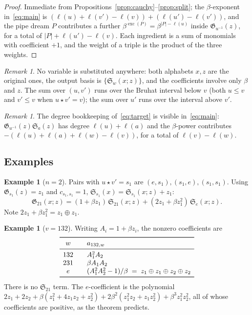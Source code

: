 \documentclass[11pt]{article}
\theoremstyle{definition}
\newtheorem{example}[theorem]{Example}
\theoremstyle{remark}
\newtheorem{remark}[theorem]{Remark}
\newcommand{\Sch}{\mathfrak{S}}
\newcommand{\Groth}{\mathfrak{G}}
\newcommand{\exc}{\operatorname{exc}}
\newcommand{\dem}{\star}
\begin{document}
\begin{proof}
Immediate from Propositions~\ref{prop:cauchy}--\ref{prop:split}; the
$\beta$-exponent in~\eqref{eq:main} is
$(\ell(u)+\ell(v')-\ell(v))+(\ell(u')-\ell(v'))$, and the pipe dream $P$
contributes a further $\beta^{\exc(P)}=\beta^{|P|-\ell(u)}$ inside
$\Groth_{u^{-1}}(z)$, for a total of $|P|+\ell(u')-\ell(v)$.
Each ingredient is a sum of monomials with coefficient $+1$, and the
weight of a triple is the product of the three weights.
\end{proof}

\begin{remark}
No variable is substituted anywhere: both alphabets $x,z$ are the original
ones, the output basis is $\{\Sch_w(x;z)\}$, and the coefficients involve
only $\beta$ and $z$.  The sum over $(u,v')$ runs over the Bruhat interval
below $v$ (both $u\le v$ and $v'\le v$ when $u\dem v'=v$); the sum over
$u'$ runs over the interval above $v'$.
\end{remark}

\begin{remark}
The degree bookkeeping of~\eqref{eq:target} is visible in~\eqref{eq:main}:
$\Groth_{u^{-1}}(z)\Sch_a(z)$ has degree $\ell(u)+\ell(a)$ and the
$\beta$-power contributes $-(\ell(u)+\ell(a)+\ell(w)-\ell(v))$, for a total
of $\ell(v)-\ell(w)$.
\end{remark}

\subsection{Examples}

\begin{example}[$n=2$]
Pairs with $u\dem v'=s_1$ are $(e,s_1),(s_1,e),(s_1,s_1)$.  Using
$\Groth_{s_1}(z)=z_1$ and $c_{s_1,s_1}=1$, $\Sch_{s_1}(x)=\Sch_{s_1}(x;z)+z_1$:
\[
 \Groth_{21}(x;z)=(1+\beta z_1)\,\Sch_{21}(x;z)+(2z_1+\beta z_1^2)\,\Sch_{e}(x;z).
\]
Note $2z_1+\beta z_1^2=z_1\oplus z_1$.
\end{example}

\begin{example}[$v=132$]
Writing $A_i=1+\beta z_i$, the nonzero coefficients are
\[
\begin{array}{c@{\qquad}l}
 \toprule
 w & a_{132,w} \\
 \midrule
 132 & A_1^2A_2 \\
 231 & \beta A_1A_2 \\
 e   & (A_1^2A_2^2-1)/\beta \;=\; z_1\oplus z_1\oplus z_2\oplus z_2 \\
 \bottomrule
\end{array}
\]
There is no $\Sch_{21}$ term.  The $e$-coefficient is the polynomial
$2z_1+2z_2+\beta(z_1^2+4z_1z_2+z_2^2)+2\beta^2(z_1^2z_2+z_1z_2^2)+\beta^3z_1^2z_2^2$,
all of whose coefficients are positive, as the theorem predicts.
\end{example}
\end{document}

